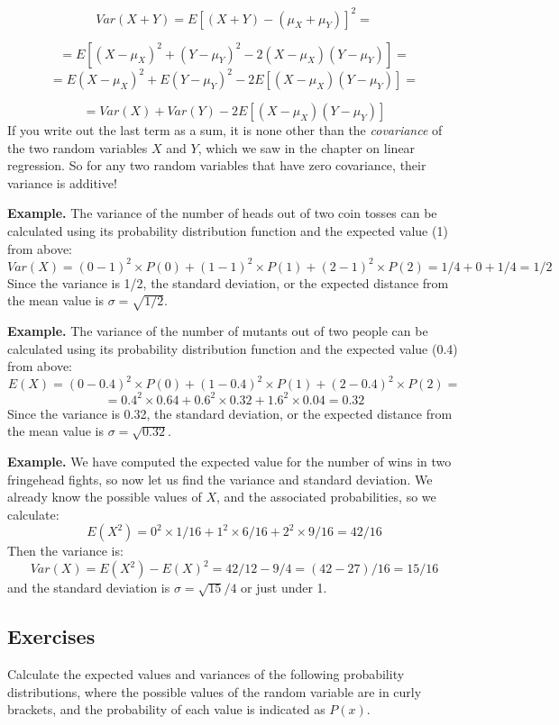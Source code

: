 \documentclass[
  letterpaper,
  DIV=11,
  numbers=noendperiod]{scrreprt}
\begin{document}
\[Var(X+Y) = E \left[ (X+Y)-(\mu_X+\mu_Y) \right]^2 =\]

\[ = E[ (X-\mu_X)^2 +(Y-\mu_Y)^2 - 2(X-\mu_X)(Y-\mu_Y)] = \]
\[=E (X-\mu_X)^2 +  E(Y-\mu_Y)^2   -2 E[(X-\mu_X)(Y-\mu_Y)] = \]

\[ = Var(X) + Var(Y)  -2 E[(X-\mu_X)(Y-\mu_Y)] \] If you write out the
last term as a sum, it is none other than the \emph{covariance} of the
two random variables \(X\) and \(Y\), which we saw in the chapter on
linear regression. So for any two random variables that have zero
covariance, their variance is additive!

\textbf{Example.} The variance of the number of heads out of two coin
tosses can be calculated using its probability distribution function and
the expected value (1) from above:
\[ Var(X) = (0-1)^2 \times P(0) + (1-1)^2 \times P(1) + (2-1)^2 \times P(2) = 1/4+0+1/4 = 1/2\]
Since the variance is 1/2, the standard deviation, or the expected
distance from the mean value is \(\sigma= \sqrt{1/2}\).

\textbf{Example.} The variance of the number of mutants out of two
people can be calculated using its probability distribution function and
the expected value (0.4) from above:
\[ E(X) = (0-0.4)^2 \times P(0) + (1-0.4)^2 \times P(1) + (2-0.4)^2 \times P(2) =\]
\[ = 0.4^2 \times 0.64+0.6^2 \times 0.32+1.6^2 \times 0.04 = 0.32\]
Since the variance is 0.32, the standard deviation, or the expected
distance from the mean value is \(\sigma= \sqrt{0.32}\).

\textbf{Example.} We have computed the expected value for the number of
wins in two fringehead fights, so now let us find the variance and
standard deviation. We already know the possible values of \(X\), and
the associated probabilities, so we calculate:
\[ E(X^2) = 0^2 \times 1/16 + 1^2 \times 6/16 + 2^2 \times 9/16 = 42/16\]
Then the variance is:
\[ Var(X) = E(X^2)  - E(X)^2 = 42/12 - 9/4 = (42-27)/16 = 15/16\] and
the standard deviation is \(\sigma = \sqrt{15}/4\) or just under 1.

\hypertarget{exercises-10}{%
\subsection{Exercises}\label{exercises-10}}

Calculate the expected values and variances of the following probability
distributions, where the possible values of the random variable are in
curly brackets, and the probability of each value is indicated as
\(P(x)\).
\end{document}
